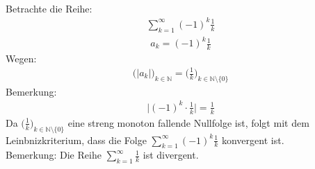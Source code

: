 \\
Betrachte die Reihe:\\
\begin{align*}
\sum\limits_{k=1}^{\infty}(-1)^k\frac{1}{k}
\end{align*}
\begin{align*}
a_k=(-1)^k\frac{1}{k}
\end{align*}
Wegen:
\begin{align*}
\big(|a_k|\big)_{k\in \mathbb{N}}=\bigg(\frac{1}{k}\bigg)_{k\in\mathbb{N}\setminus\{0\}}
\end{align*}
Bemerkung:\\
\begin{align*}
\bigg|(-1)^k\cdot\frac{1}{k}\bigg|=\frac{1}{k}
\end{align*}
Da $\big(\frac{1}{k}\big)_{k\in\mathbb{N}\setminus\{0\}}  $ eine streng monoton fallende Nullfolge ist, folgt mit dem Leinbnizkriterium, dass die Folge $ \sum\limits_{k=1}^{\infty}(-1)^k\frac{1}{k} $ konvergent ist.\\
Bemerkung:
Die Reihe $ \sum\limits_{k=1}^{\infty}\frac{1}{k} $ ist divergent.\\
\newpage
\noindent
